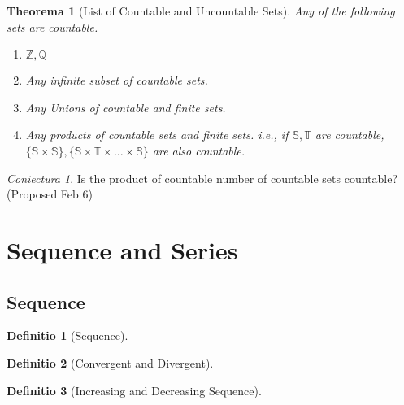 \documentclass[12pt, a4paper]{report}
\newtheorem{theorem}{Theorema}[section]
\theoremstyle{definition}
\newtheorem{definition}{Definitio}[section]
\theoremstyle{definition}
\theoremstyle{remark}
\newtheorem{hypothesis}{Coniectura}[section]
\begin{document}
\begin{theorem}[List of Countable and Uncountable Sets]
	Any of the following sets are countable.
	\begin{enumerate}
		\item $\mathbb{Z}, \mathbb{Q}$ 
		\item Any infinite subset of countable sets.
		\item Any Unions of countable and finite sets.
		\item Any products of countable sets and finite sets. i.e., if $\mathbb{S}, \mathbb{T}$ are countable, $\{\mathbb{S}\times \mathbb{S}\}, \{\mathbb{S}\times \mathbb{T}\times \dots \times \mathbb{S} \}$ are also countable.
	\end{enumerate}
\end{theorem}

\begin{hypothesis}
Is the product of countable number of countable sets countable? (Proposed Feb 6)
\end{hypothesis}

\section{Sequence and Series}
\subsection{Sequence}
\begin{definition}[Sequence]
\end{definition}

\begin{definition}[Convergent and Divergent]
\end{definition}

\begin{definition}[Increasing and Decreasing Sequence]
\end{definition}
\end{document}
